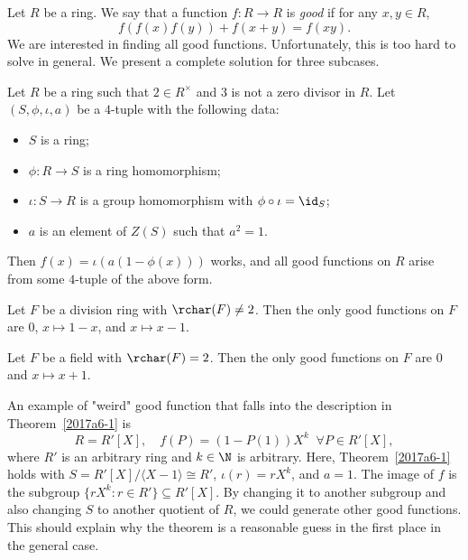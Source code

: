 Let $R$ be a ring.
We say that a function $f : R \to R$ is \emph{good} if for any $x, y \in R$,
\[ f(f(x) f(y)) + f(x + y) = f(xy). \tag{*}\label{2017a6-eq0} \]
We are interested in finding all good functions.
Unfortunately, this is too hard to solve in general.
We present a complete solution for three subcases.

\begin{theorem}\label{2017a6-1}
Let $R$ be a ring such that $2 \in R^{\times}$ and $3$ is not a zero divisor in $R$.
Let $(S, \phi, \iota, a)$ be a $4$-tuple with the following data:
\begin{itemize}
    \item   $S$ is a ring;
    \item   $\phi : R \to S$ is a ring homomorphism;
    \item   $\iota : S \to R$ is a group homomorphism with $\phi \circ \iota = \id_S$;
    \item   $a$ is an element of $Z(S)$ such that $a^2 = 1$.
\end{itemize}
Then $f(x) = \iota(a(1 - \phi(x)))$ works, and all good functions on $R$ arise from some $4$-tuple of the above form.
\end{theorem}

\begin{theorem}\label{2017a6-2}
Let $F$ be a division ring with $\rchar(F) \neq 2$.
Then the only good functions on $F$ are $0$, $x \mapsto 1 - x$, and $x \mapsto x - 1$.
\end{theorem}

\begin{theorem}\label{2017a6-3}
Let $F$ be a field with $\rchar(F) = 2$.
Then the only good functions on $F$ are $0$ and $x \mapsto x + 1$.
\end{theorem}

An example of "weird" good function that falls into the description in Theorem~\ref{2017a6-1} is
\[ R = R'[X], \quad f(P) = (1 - P(1)) X^k \;\; \forall P \in R'[X], \]
    where $R'$ is an arbitrary ring and $k \in \N$ is arbitrary.
Here, Theorem~\ref{2017a6-1} holds with $S = R'[X]/\langle X - 1\rangle \cong R'$, $\iota(r) = rX^k$, and $a = 1$.
The image of $f$ is the subgroup $\{rX^k : r \in R'\} \subseteq R'[X]$.
By changing it to another subgroup and also changing $S$ to another quotient of $R$, we could generate other good functions.
This should explain why the theorem is a reasonable guess in the first place in the general case.





